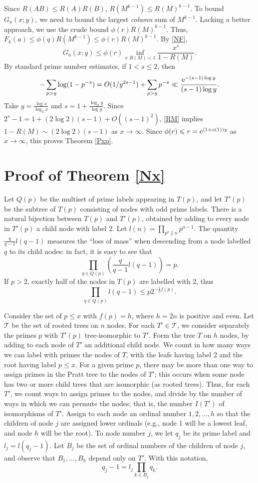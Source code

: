 \documentclass[12pt]{amsart}
\theoremstyle{remark}
\theoremstyle{plain}
\numberwithin{equation}{section}
\newcommand{\be}{\begin{equation}}
\newcommand{\ee}{\end{equation}}
\renewcommand{\(}{\left(}
\renewcommand{\)}{\right)}
\newcommand{\er}{{\rm e}}  %
\renewcommand{\le}{\leqslant}
\begin{document}
Since $R(AB)\le R(A) R(B)$, $R(M^{k-1}) \le R(M)^{k-1}$.
To bound $G_a(x;y)$, we need to
bound the largest \emph{column} sum of $M^{k-1}$.  Lacking a better
approach, we use the crude bound $\phi(r) R(M)^{k-1}$.  Thus,
$F_k(a) \le  \phi(q) R(M^{k-1}) \le \phi(r) R(M)^{k-1}.$
By \eqref{NF},
\[
G_a(x;y) \le \phi(r) \inf_{s:R(M)<1}
\frac{x^s}{1-R(M)}.
\]
By standard prime number estimates, if $1<s\le 2$, then
\[
-\sum_{p>y} \log(1-p^{-s}) = O(1/y^{2s-1}) + \sum_{p>y} p^{-s} 
 \ll \frac{\er^{-(s-1)\log y}}{(s-1)\log y}.
\]
Take $y=\frac{\log x}{\log_2 x}$ and $s=1+\frac{\log_2 y}{\log y}$.  
Since $2^s-1=1+(2\log 2)(s-1)+O((s-1)^2)$, 
\eqref{RM} implies
$1-R(M) \sim (2\log 2) (s-1)$ as $x\to\infty$.   
Since $\phi(r) \le r = \er^{(1+o(1))y}$ as $x\to\infty$, this proves 
Theorem \ref{Pxp}.

%
\section{Proof of Theorem \ref{Nx}}\label{sec:Px}
%


Let $Q(p)$ be the multiset of prime labels appearing in $T(p)$,
and let $T'(p)$ be the subtree of $T(p)$ consisting of nodes with
odd prime labels.  There is a natural bijection between $T(p)$ and $T'(p)$,
obtained by adding to every node in $T'(p)$ a child node with label 2.
Let $l(n)=\prod_{p^a \| n} p^{a-1}$.  The quantity $\frac{q}{q-1}l(q-1)$
measures the ``loss of mass'' when descending from a node labelled $q$
to its child nodes: in fact, it is easy to see that
\[
 \prod_{q\in Q(p)} \( \frac{q}{q-1} l(q-1) \) = p.
\]
If $p>2$, exactly half of the nodes in $T(p)$ are labelled with 2, thus
\be\label{prodl}
\prod_{q\in Q(p)} l(q-1) \le p 2^{-\frac12 f(p)}.
\ee

Consider the set of $p\le x$ with $f(p)=h$, where $h=2n$ is positive and even.
Let $\mathcal{T}$ be the set of rooted trees on $n$ nodes.  
For each $T'\in \mathcal{T}$, we
consider separately the primes $p$ with $T'(p)$ tree-isomorphic to $T'$.
Form the tree $T$ on $h$ nodes, by adding to each node of
$T'$ an additional child node.  We count in how many ways we can label with primes the nodes of $T$, with the leafs having label 2 and the root having
label $p\le x$.  For a given prime $p$, there may be more than one way
to assign primes in the Pratt tree to the nodes of $T'$; this occurs
when some node has two or more child trees that are isomorphic (as rooted trees).  Thus, for each $T'$, we count ways to assign primes to the nodes,
and divide by the number of ways in which 
we can permute the nodes; that is, the
number $I(T')$ of isomorphisms of $T'$.
Assign to each node
an ordinal number $1,2,\ldots,h$ so that the children of node $j$
are assigned lower ordinals (e.g., node 1 will be a lowest leaf, and node $h$
will be the root).  To node number $j$, we let $q_j$ be its prime label 
and $l_j=l(q_j-1)$.  Let $B_j$ be the set of ordinal numbers of the 
children of node
$j$, and observe that $B_1,\ldots,B_h$ depend only on $T'$.  With this notation,
\be\label{qlq}
q_j-1 = l_j \prod_{k\in B_j} q_k.
\ee
\end{document}
